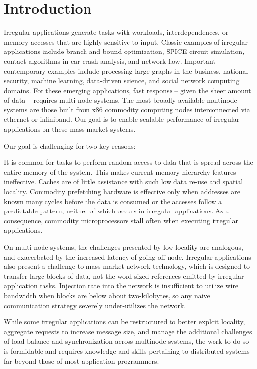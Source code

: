 \section{Introduction} \label{sec:intro}

Irregular applications generate tasks with workloads, interdependences, or memory
accesses that are highly sensitive to input. Classic examples of irregular
applications include branch and bound optimization, SPICE circuit simulation,
contact algorithms in car crash analysis, and network flow. Important
contemporary examples include processing large graphs in the business,
national security, machine learning, data-driven science, and social network
computing domains. For these emerging applications, fast response -- given the
sheer amount of data -- requires multi-node systems. The most broadly available
multinode systems are those built from x86 commodity computing nodes
interconnected via ethernet or infiniband. Our goal is to enable scalable
performance of irregular applications on these mass market systems.

Our goal is challenging for two key reasons: 

It is common for tasks to perform random access to data that is spread
across the entire memory of the system. This makes current
memory hierarchy features ineffective. Caches are of little assistance
with such low data re-use and spatial locality. Commodity prefetching
hardware is effective only when addresses are known many cycles before
the data is consumed or the accesses follow a predictable pattern,
neither of which occurs in irregular applications. As a consequence,
commodity microprocessors stall often when executing irregular
applications.

 On multi-node systems, the challenges presented by low
locality are analogous, and exacerbated by the increased latency of going
off-node. Irregular applications also present a challenge to mass market
network technology, which is designed to transfer large blocks of data, not
the word-sized references emitted by irregular application tasks. Injection
rate into the network is insufficient to utilize wire bandwidth when blocks
are below about two-kilobytes, so any naive communication strategy
severely under-utilizes the network. 

While some irregular applications can be restructured to better exploit
locality, aggregate requests to increase message size, and manage the
additional challenges of load balance and synchronization across multinode
systems, the work to do so is formidable and requires knowledge and skills
pertaining to distributed systems far beyond those of most application
programmers.

